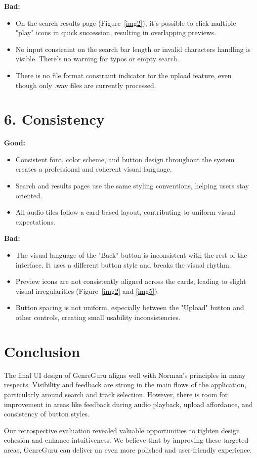 \documentclass[12pt]{article}
\begin{document}
\noindent\textbf{Bad:}
\begin{itemize}
    \item On the search results page (Figure~\ref{img2}), it's possible to click multiple "play" icons in quick succession, resulting in overlapping previews.
    \item No input constraint on the search bar length or invalid characters handling is visible. There’s no warning for typos or empty search.
    \item There is no file format constraint indicator for the upload feature, even though only .wav files are currently processed.
\end{itemize}


\section*{6. Consistency}

\noindent\textbf{Good:}
\begin{itemize}
    \item Consistent font, color scheme, and button design throughout the system creates a professional and coherent visual language.
    \item Search and results pages use the same styling conventions, helping users stay oriented.
    \item All audio tiles follow a card-based layout, contributing to uniform visual expectations.
\end{itemize}

\noindent\textbf{Bad:}
\begin{itemize}
    \item The visual language of the "Back" button is inconsistent with the rest of the interface. It uses a different button style and breaks the visual rhythm.
    \item Preview icons are not consistently aligned across the cards, leading to slight visual irregularities (Figure~\ref{img2} and \ref{img5}).
    \item Button spacing is not uniform, especially between the "Upload" button and other controls, creating small usability inconsistencies.
\end{itemize}


\section*{Conclusion}
The final UI design of GenreGuru aligns well with Norman's principles in many respects. Visibility and feedback are strong in the main flows of the application, particularly around search and track selection. However, there is room for improvement in areas like feedback during audio playback, upload affordance, and consistency of button styles.

Our retrospective evaluation revealed valuable opportunities to tighten design cohesion and enhance intuitiveness. We believe that by improving these targeted areas, GenreGuru can deliver an even more polished and user-friendly experience.
\end{document}
